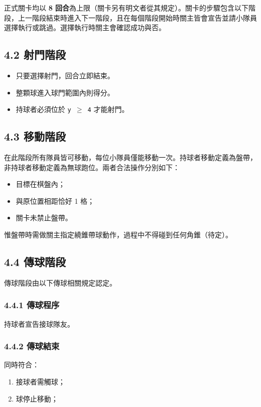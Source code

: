 \documentclass[11pt]{article}
\newcommand{\term}[1]{\textbf{#1}}
\newcommand{\coord}[1]{\texttt{#1}}
\begin{document}
正式關卡均以 \term{8 回合}為上限（關卡另有明文者從其規定）。關卡的步驟包含以下階段，上一階段結束時進入下一階段，且在每個階段開始時關主皆會宣告並請小隊員選擇執行或跳過。選擇執行時關主會確認成功與否。

\subsection*{4.2 射門階段}

\begin{itemize}
  \item 只要選擇射門，回合立即結束。
  \item 整顆球進入球門範圍內則得分。
  \item 持球者必須位於 \coord{y $\geq$ 4} 才能射門。
\end{itemize}

\subsection*{4.3 移動階段}

在此階段所有隊員皆可移動，每位小隊員僅能移動一次。持球者移動定義為盤帶，非持球者移動定義為無球跑位。兩者合法操作分別如下：

\begin{itemize}
  \item 目標在棋盤內；
  \item 與原位置相距恰好 1 格；
  \item 關卡未禁止盤帶。
\end{itemize}

惟盤帶時需做關主指定繞錐帶球動作，過程中不得碰到任何角錐（待定）。

\subsection*{4.4 傳球階段}

傳球階段由以下傳球相關規定認定。

\subsubsection*{4.4.1 傳球程序}

持球者宣告接球隊友。

\subsubsection*{4.4.2 傳球結束}

同時符合：

\begin{enumerate}
  \item 接球者需觸球；
  \item 球停止移動；
\end{enumerate}
\end{document}
